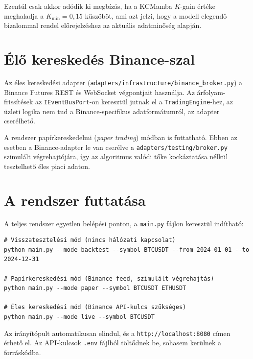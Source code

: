 Ezentúl csak akkor adódik ki megbízás, ha a KCMamba $K$-gain értéke
meghaladja a $K_\text{min} = 0{,}15$ küszöböt, ami azt jelzi, hogy a modell
elegendő bizalommal rendel előrejelzéshez az aktuális adatminőség alapján.


\section{Élő kereskedés Binance-szal}
\label{sec:live_trading}

Az éles kereskedési adapter (\texttt{adapters/infrastructure/binance\_broker.py})
a Binance Futures REST és WebSocket végpontjait használja. Az árfolyam-frissítések
az \texttt{IEventBusPort}-on keresztül jutnak el a \texttt{TradingEngine}-hez,
az üzleti logika nem tud a Binance-specifikus adatformátumról, az adapter cserélhető.


A rendszer papírkereskedelmi (\emph{paper trading}) módban is futtatható.
Ebben az esetben a Binance-adapter le van cserélve a
\texttt{adapters/testing/broker.py} szimulált végrehajtójára, így az algoritmus
valódi tőke kockáztatása nélkül tesztelhető éles piaci adaton.

\section{A rendszer futtatása}
\label{sec:running}

A teljes rendszer egyetlen belépési ponton, a \texttt{main.py} fájlon
keresztül indítható:

\begin{verbatim}
# Visszatesztelési mód (nincs hálózati kapcsolat)
python main.py --mode backtest --symbol BTCUSDT --from 2024-01-01 --to 2024-12-31

# Papírkereskedési mód (Binance feed, szimulált végrehajtás)
python main.py --mode paper --symbol BTCUSDT ETHUSDT

# Éles kereskedési mód (Binance API-kulcs szükséges)
python main.py --mode live --symbol BTCUSDT
\end{verbatim}

Az irányítópult automatikusan elindul, és a \texttt{http://localhost:8080}
címen érhető el.  Az API-kulcsok \texttt{.env} fájlból töltődnek be, sohasem
kerülnek a forráskódba.

